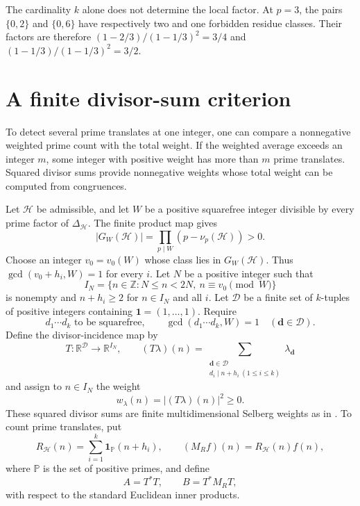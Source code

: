 \documentclass[11pt]{article}
\begin{document}
The cardinality $k$ alone does not determine the local factor.
At $p=3$, the pairs $\{0,2\}$ and $\{0,6\}$ have respectively two
and one forbidden residue classes.  Their factors are therefore
$(1-2/3)/(1-1/3)^2=3/4$ and $(1-1/3)/(1-1/3)^2=3/2$.

\section{A finite divisor-sum criterion}

To detect several prime translates at one integer, one can compare a
nonnegative weighted prime count with the total weight.  If the weighted
average exceeds an integer $m$, some integer with positive weight has more
than $m$ prime translates.  Squared divisor sums provide nonnegative weights
whose total weight can be computed from congruences.

Let $\mathcal H$ be admissible, and let $W$ be a positive squarefree integer
divisible by every prime factor of $\Delta_{\mathcal H}$.  The finite product
map gives
\[
 |G_W(\mathcal H)|=\prod_{p\mid W}(p-\nu_p(\mathcal H))>0.
\]
Choose an integer $v_0=v_0(W)$ whose class lies in $G_W(\mathcal H)$.  Thus
$\gcd(v_0+h_i,W)=1$ for every $i$.  Let $N$ be a positive integer such that
\[
 I_N=\{n\in\mathbb Z:N\leq n<2N,\ n\equiv v_0\pmod W\}
\]
is nonempty and $n+h_i\geq2$ for $n\in I_N$ and all $i$.  Let
$\mathcal D$ be a finite set of $k$-tuples of positive integers containing
$\boldsymbol 1=(1,\ldots,1)$.  Require
\[
 d_1\cdots d_k\text{ to be squarefree},
 \qquad \gcd(d_1\cdots d_k,W)=1
 \quad(\boldsymbol d\in\mathcal D).
\]
Define the divisor-incidence map by
\[
 T:\mathbb R^{\mathcal D}\longrightarrow\mathbb R^{I_N},
 \qquad
 (T\lambda)(n)=
 \sum_{\substack{\boldsymbol d\in\mathcal D\\
                  d_i\mid n+h_i\ (1\leq i\leq k)}}
 \lambda_{\boldsymbol d}
\]
and assign to $n\in I_N$ the weight
\[
 w_\lambda(n)=|(T\lambda)(n)|^2\geq0.
\]
These squared divisor sums are finite multidimensional Selberg weights
as in \cite[(2.4), (4.2)--(4.3)]{Maynard}.  To count prime translates, put
\[
 R_{\mathcal H}(n)=\sum_{i=1}^k\mathbf 1_{\mathbb P}(n+h_i),
 \qquad (M_Rf)(n)=R_{\mathcal H}(n)f(n),
\]
where $\mathbb P$ is the set of positive primes, and define
\[
 A=T^*T,\qquad B=T^*M_RT,
\]
with respect to the standard Euclidean inner products.
\end{document}
